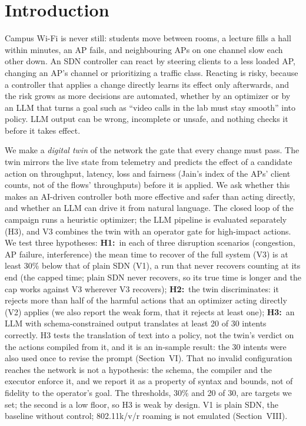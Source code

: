 \documentclass[conference]{IEEEtran}
\begin{document}
\section{Introduction}
Campus Wi-Fi is never still: students move between rooms, a lecture fills a hall within minutes, an AP fails, and neighbouring APs on one channel slow each other down. An SDN controller can react by steering clients to a less loaded AP, changing an AP's channel or prioritizing a traffic class. Reacting is risky, because a controller that applies a change directly learns its effect only afterwards, and the risk grows as more decisions are automated, whether by an optimizer or by an LLM that turns a goal such as ``video calls in the lab must stay smooth'' into policy. LLM output can be wrong, incomplete or unsafe, and nothing checks it before it takes effect.

We make a \emph{digital twin} of the network the gate that every change must pass. The twin mirrors the live state from telemetry and predicts the effect of a candidate action on throughput, latency, loss and fairness (Jain's index of the APs' client counts, not of the flows' throughputs) before it is applied. We ask whether this makes an AI-driven controller both more effective and safer than acting directly, and whether an LLM can drive it from natural language. The closed loop of the campaign runs a heuristic optimizer; the LLM pipeline is evaluated separately (H3), and V3 combines the twin with an operator gate for high-impact actions. We test three hypotheses:
\textbf{H1:}~in each of three disruption scenarios (congestion, AP failure, interference) the mean time to recover of the full system (V3) is at least 30\% below that of plain SDN (V1), a run that never recovers counting at its end (the capped time; plain SDN never recovers, so its true time is longer and the cap works against V3 wherever V3 recovers);
\textbf{H2:}~the twin discriminates: it rejects more than half of the harmful actions that an optimizer acting directly (V2) applies (we also report the weak form, that it rejects at least one);
\textbf{H3:}~an LLM with schema-constrained output translates at least 20 of 30 intents correctly. H3 tests the translation of text into a policy, not the twin's verdict on the actions compiled from it, and it is an in-sample result: the 30 intents were also used once to revise the prompt (Section~VI). That no invalid configuration reaches the network is not a hypothesis: the schema, the compiler and the executor enforce it, and we report it as a property of syntax and bounds, not of fidelity to the operator's goal. The thresholds, 30\% and 20 of 30, are targets we set; the second is a low floor, so H3 is weak by design. V1 is plain SDN, the baseline without control; 802.11k/v/r roaming is not emulated (Section~VIII).
\end{document}
